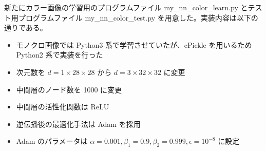 \documentclass[a4paper,dvipdfmx]{jsarticle}
\begin{document}
新たにカラー画像の学習用のプログラムファイル my\_nn\_color\_learn.py とテスト用プログラムファイル my\_nn\_color\_test.py を用意した。実装内容は以下の通りである。

\begin{itemize}
	\item モノクロ画像では Python3 系で学習させていたが、cPickle を用いるため Python2 系で実装を行った
	\item 次元数を $ d=1 \times 28 \times 28 $ から $ d=3 \times 32 \times 32 $ に変更
	\item 中間層のノード数を 1000 に変更
	\item 中間層の活性化関数は ReLU
	\item 逆伝播後の最適化手法は Adam を採用
	\item Adam のパラメータは $\alpha = 0.001, \beta_1 = 0.9, \beta_2 =  0.999, \epsilon = 10^{-8}$ に設定
\end{itemize}
\end{document}
